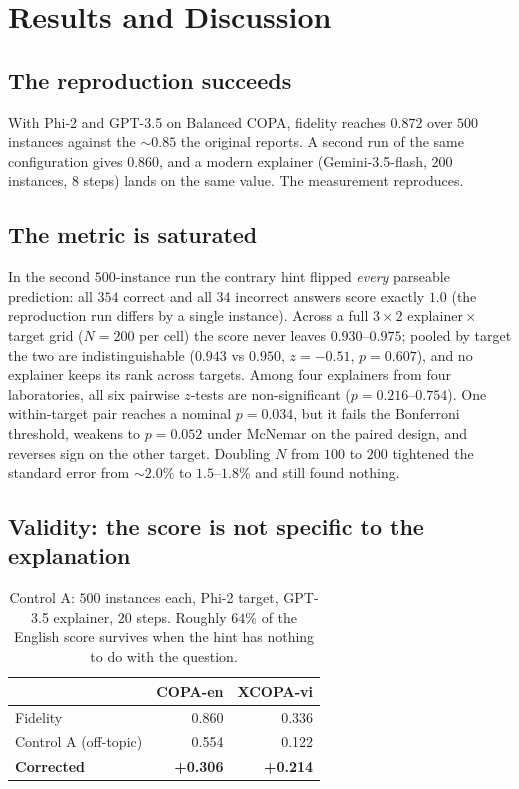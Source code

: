 \documentclass[11pt]{article}
\begin{document}
\section{Results and Discussion}

\subsection{The reproduction succeeds}
\label{sec:repro}

With Phi-2 and GPT-3.5 on Balanced COPA, fidelity reaches $0.872$ over $500$
instances against the $\sim\!0.85$ the original reports. A second run of the
same configuration gives $0.860$, and a modern explainer (Gemini-3.5-flash,
$200$ instances, $8$ steps) lands on the same value. The measurement
reproduces.

\subsection{The metric is saturated}
\label{sec:ceiling}

In the second $500$-instance run the contrary hint flipped \emph{every}
parseable prediction: all $354$ correct and all $34$ incorrect answers score
exactly $1.0$ (the reproduction run differs by a single instance). Across a
full $3\times2$ explainer\,$\times$\,target grid ($N=200$ per cell) the score
never leaves $0.930$--$0.975$; pooled by target the two are indistinguishable
($0.943$ vs $0.950$, $z=-0.51$, $p=0.607$), and no explainer keeps its rank
across targets. Among four explainers from four laboratories, all six pairwise
$z$-tests are non-significant ($p=0.216$--$0.754$). One within-target pair
reaches a nominal $p=0.034$, but it fails the Bonferroni threshold, weakens to
$p=0.052$ under McNemar on the paired design, and reverses sign on the other
target. Doubling $N$ from $100$ to $200$ tightened the standard error from
${\sim}2.0\%$ to $1.5$--$1.8\%$ and still found nothing.

\subsection{Validity: the score is not specific to the explanation}
\label{sec:validity}

\begin{table}[t]
\centering\small
\begin{tabular}{lrr}
\toprule
 & \textbf{COPA-en} & \textbf{XCOPA-vi} \\
\midrule
Fidelity                & 0.860 & 0.336 \\
Control A (off-topic)   & 0.554 & 0.122 \\
\textbf{Corrected}      & \textbf{+0.306} & \textbf{+0.214} \\
\bottomrule
\end{tabular}
\caption{Control A: $500$ instances each, Phi-2 target, GPT-3.5 explainer,
$20$ steps. Roughly $64\%$ of the English score survives when the hint has
nothing to do with the question.}
\label{tab:controlA}
\end{table}
\end{document}
